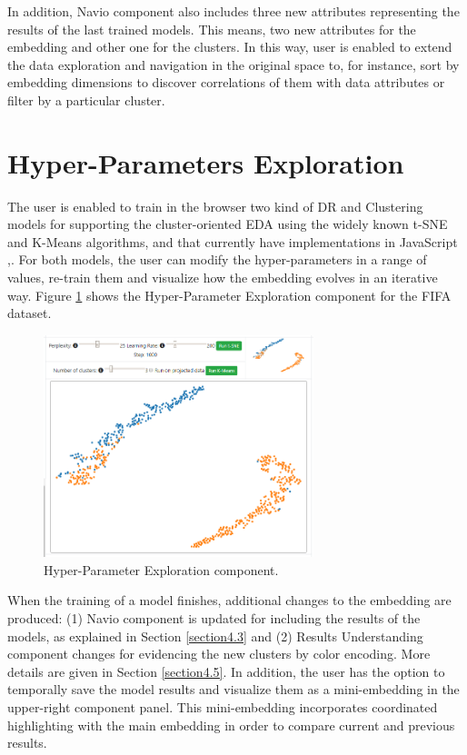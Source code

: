 In addition, Navio component also includes three new attributes representing the results of the last trained models. This means, two new attributes for the embedding and other one for the clusters. In this way, user is enabled to extend the data exploration and navigation in the original space to, for instance, sort by embedding dimensions to discover correlations of them with data attributes or filter by a particular cluster. 

\section{Hyper-Parameters Exploration}
\label{section4.4}

The user is enabled to train in the browser two kind of DR and Clustering models for supporting the cluster-oriented EDA using the widely known t-SNE \cite{VanDerMaaten2008} and K-Means \cite{Lloyd1982LeastPCM} algorithms, and that currently have implementations in JavaScript \cite{Pezzotti2018LinearWeb},\cite{Asensio2018Ml-kmeans}. For both models, the user can modify the hyper-parameters in a range of values, re-train them and visualize how the embedding evolves in an iterative way. Figure \ref{fig:model-space-exploration-component} shows the Hyper-Parameter Exploration component for the FIFA dataset.

\begin{figure}[ht]
 \centering
 \includegraphics[width=0.7\textwidth]{model-space-exploration.png}
 \caption{Hyper-Parameter Exploration component.}
 \label{fig:model-space-exploration-component}
\end{figure}

When the training of a model finishes, additional changes to the embedding are produced: (1) Navio component is updated for including the results of the models, as explained in Section \ref{section4.3} and (2) Results Understanding component changes for evidencing the new clusters by color encoding. More details are given in Section \ref{section4.5}. In addition, the user has the option to temporally save the model results and visualize them as a mini-embedding in the upper-right component panel. This mini-embedding incorporates coordinated highlighting with the main embedding in order to compare current and previous results.

